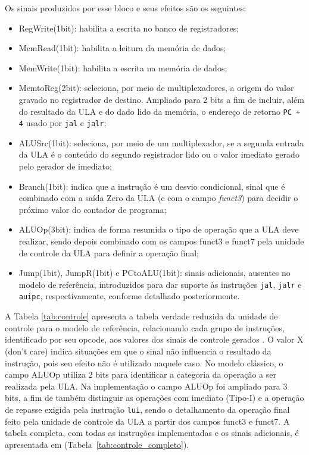 \documentclass[conference]{IEEEtran}
\begin{document}
Os sinais produzidos por esse bloco e seus efeitos são os seguintes:

\begin{itemize}
    \item RegWrite(1bit): habilita a escrita no banco de registradores;
    \item MemRead(1bit): habilita a leitura da memória de dados;
    \item MemWrite(1bit): habilita a escrita na memória de dados;
    \item MemtoReg(2bit): seleciona, por meio de multiplexadores, a origem do valor gravado no registrador de
    destino. Ampliado para 2 bits a fim de incluir, além do resultado da ULA e do dado lido da memória,
    o endereço de retorno \texttt{PC + 4} usado por \texttt{jal} e \texttt{jalr};
    \item ALUSrc(1bit): seleciona, por meio de um multiplexador, se a segunda entrada da ULA é o conteúdo
    do segundo registrador lido ou o valor imediato gerado pelo gerador de imediato;
    \item Branch(1bit): indica que a instrução é um desvio condicional, sinal que é combinado com a saída Zero
    da ULA (e com o campo \textit{funct3}) para decidir o próximo valor do contador de programa;
    \item ALUOp(3bit): indica de forma resumida o tipo de operação que a ULA deve realizar, sendo depois
    combinado com os campos funct3 e funct7 pela unidade de controle da ULA para definir a operação final;
    \item Jump(1bit), JumpR(1bit) e PCtoALU(1bit): sinais adicionais, ausentes no modelo de referência, introduzidos para dar
    suporte às instruções \texttt{jal}, \texttt{jalr} e \texttt{auipc}, respectivamente, conforme detalhado
    posteriormente.
\end{itemize}

A Tabela \ref{tab:controle} apresenta a tabela verdade reduzida da unidade de controle para o modelo de
referência, relacionando cada grupo de instruções, identificado por seu opcode, aos valores dos sinais de
controle gerados \cite{patterson2020computer}. O valor X (don't care) indica situações em que o sinal não
influencia o resultado da instrução, pois seu efeito não é utilizado naquele caso. No modelo clássico, o
campo ALUOp utiliza 2 bits para identificar a categoria da operação a ser realizada pela ULA. Na implementação 
o campo ALUOp foi ampliado para 3 bits, a fim de também distinguir as operações com imediato (Tipo-I) e a
operação de repasse exigida pela instrução \texttt{lui}, sendo o detalhamento da operação final feito pela
unidade de controle da ULA a partir dos campos funct3 e funct7. A tabela completa, com todas as instruções
implementadas e os sinais adicionais, é apresentada em (Tabela~\ref{tab:controle_completo}).
\end{document}
